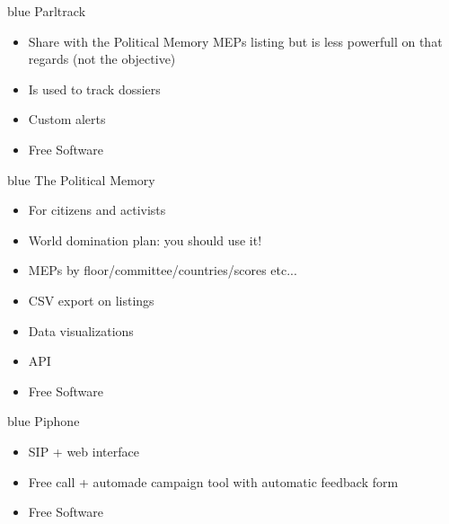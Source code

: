 \documentclass{beamer}
\begin{document}
\begin{frame}[fragile]{}
\begin{LARGE}
\begin{color}{blue}
    Parltrack
\end{color}
\end{LARGE}
\vspace{3mm}
\begin{itemize}
    \item Share with the Political Memory MEPs listing but is less powerfull on that regards (not the objective)
    \item Is used to track dossiers
    \item Custom alerts
    \item Free Software
\end{itemize}
\end{frame}

\begin{frame}[fragile]{}
\begin{LARGE}
\begin{color}{blue}
    The Political Memory
\end{color}
\end{LARGE}
\vspace{3mm}
\begin{itemize}
    \item For citizens and activists
    \item World domination plan: you should use it!
    \item MEPs by floor/committee/countries/scores etc...
    \item CSV export on listings
    \item Data visualizations
    \item API
    \item Free Software
\end{itemize}
\end{frame}

\begin{frame}[fragile]{}
\begin{LARGE}
\begin{color}{blue}
    Piphone
\end{color}
\end{LARGE}
\vspace{3mm}
\begin{itemize}
    \item SIP + web interface
    \item Free call + automade campaign tool with automatic feedback form
    \item Free Software
\end{itemize}
\end{frame}
\end{document}
